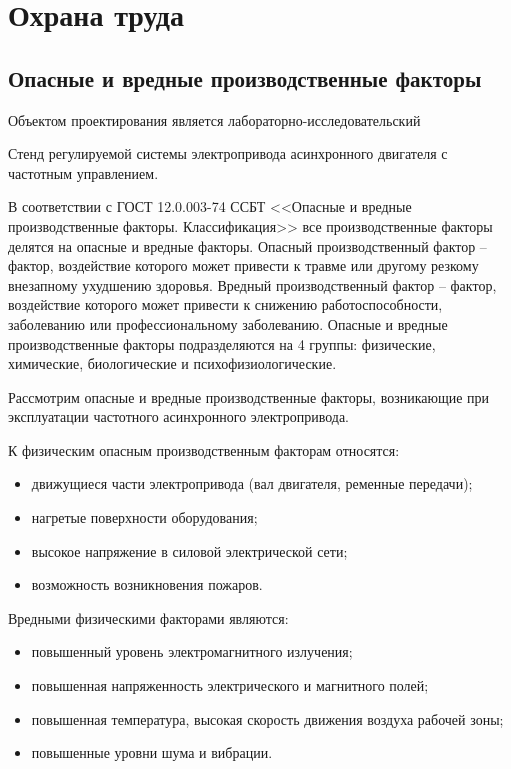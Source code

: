 \section{Охрана труда}
    \subsection{Опасные и вредные производственные факторы}
        Объектом проектирования является лабораторно-исследовательский 

        Стенд регулируемой системы электропривода асинхронного двигателя с
        частотным управлением.

        В соответствии с ГОСТ 12.0.003-74 ССБТ <<Опасные и вредные
        производственные факторы.  Классификация>> все производственные факторы
        делятся на опасные и вредные факторы. Опасный производственный фактор –
        фактор, воздействие которого может привести к травме или другому
        резкому внезапному ухудшению здоровья. Вредный производственный фактор
        – фактор, воздействие которого может привести к снижению
        работоспособности, заболеванию или профессиональному заболеванию.
        Опасные и вредные производственные факторы подразделяются на 4 группы:
        физические, химические, биологические и психофизиологические. 

        Рассмотрим опасные и вредные производственные факторы, возникающие при
        эксплуатации частотного асинхронного электропривода.

        К физическим опасным производственным факторам относятся:
        \begin{itemize}
            \item движущиеся части электропривода  (вал двигателя, ременные
                передачи);
            \item нагретые поверхности оборудования;
            \item высокое напряжение в силовой электрической сети; 
            \item возможность возникновения пожаров.
        \end{itemize}

       Вредными физическими факторами являются:
        \begin{itemize}
            \item повышенный уровень электромагнитного излучения;
            \item повышенная напряженность электрического и магнитного полей;
            \item повышенная температура, высокая скорость движения воздуха
                рабочей зоны;
            \item повышенные уровни шума и вибрации.
        \end{itemize}


